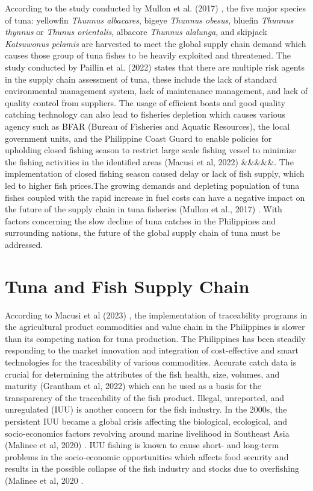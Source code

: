 According to the study conducted by Mullon et al. (2017) \nocite{rrl-FRP3}, the five major species of tuna: yellowfin \textit{Thunnus albacares}, bigeye \textit{Thunnus obesus}, bluefin \textit{Thunnus thynnus} or \textit{Thunus orientalis}, albacore \textit{Thunnus alalunga}, and skipjack \textit{Katsuwonus pelamis} are harvested to meet the global supply chain demand  which causes those group of tuna fishes to be heavily exploited and threatened. The study conducted by Paillin et al. (2022) \nocite{rrl-FRP4} states that there are multiple risk agents in the supply chain assessment of tuna, these include the lack of standard environmental management system, lack of maintenance management, and lack of quality control from suppliers. The usage of efficient boats and good quality catching technology can also lead to fisheries depletion which causes various agency such as BFAR (Bureau of Fisheries and Aquatic Resources), the local government units, and the Philippine Coast Guard to enable policies for upholding closed fishing season to restrict large scale fishing vessel to minimize the fishing activities in the identified areas (Macusi et al, 2022) \&\&\&\&\&. The implementation of closed fishing season caused delay or lack of fish supply, which led to higher fish prices.The growing demands and depleting population of tuna fishes coupled with the rapid increase in fuel costs can have a negative impact on the future of the supply chain in tuna fisheries (Mullon et al., 2017) \nocite{rrl-FRP2}. With factors concerning the slow decline of tuna catches in the Philippines and surrounding nations, the future of the global supply chain of tuna must be addressed.

\section{Tuna and Fish Supply Chain}

According to Macusi et al (2023) \nocite{rrl-TFSC1}, the implementation of traceability programs in the agricultural product commodities and value chain in the Philippines is slower than its competing nation for tuna production. The Philippines has been steadily responding to the market innovation and integration of cost-effective and smart technologies for the traceability of various commodities. Accurate catch data is crucial for determining the attributes of the fish health, size, volumes, and maturity (Grantham et al, 2022) \nocite{rrl-TFSC2} which can be used as a basis for the transparency of the traceability of the fish product. Illegal, unreported, and unregulated (IUU) is another concern for the fish industry. In the 2000s, the persistent IUU became a global crisis affecting the biological, ecological, and socio-economics factors revolving around marine livelihood in Southeast Asia (Malinee et al, 2020) \nocite{rrl-TFSC3}. IUU fishing is known to cause short- and long-term problems in the socio-economic opportunities which affects food security and results in the possible collapse of the fish industry and stocks due to overfishing (Malinee et al, 2020 \nocite{rrl-TFSC3}. 

